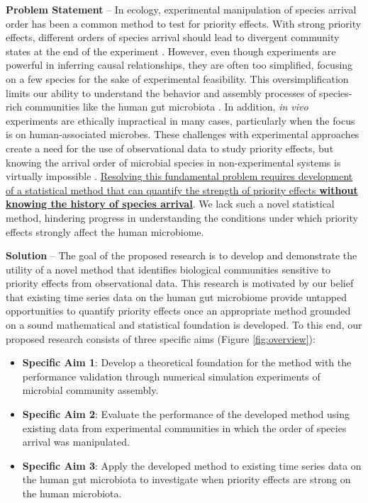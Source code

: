 \documentclass[12pt, class=article, crop=false]{standalone}
\begin{document}
\textbf{Problem Statement} --
In ecology, experimental manipulation of species arrival order has been a common method to test for priority effects.
With strong priority effects, different orders of species arrival should lead to divergent community states at the end of the experiment \citep{fukami_historical_2015, sprockett_role_2018}.
However, even though experiments are powerful in inferring causal relationships, they are often too simplified, focusing on a few species for the sake of experimental feasibility.
This oversimplification limits our ability to understand the behavior and assembly processes of species-rich communities like the human gut microbiota \citep{fierer_animalcules_2012}. 
In addition, \textit{in vivo} experiments are ethically impractical in many cases, particularly when the focus is on human-associated microbes. 
These challenges with experimental approaches create a need for the use of observational data to study priority effects, but knowing the arrival order of microbial species in non-experimental systems is virtually impossible  \citep{sprockett_role_2018}.
\ul{Resolving this fundamental problem requires development of a statistical method that can quantify the strength of priority effects \textbf{without knowing the history of species arrival}}.
We lack such a novel statistical method, hindering progress in understanding the conditions under which priority effects strongly affect the human microbiome.

\textbf{Solution} --
The goal of the proposed research is to develop and demonstrate the utility of a novel method that identifies biological communities sensitive to priority effects from observational data.
This research is motivated by our belief that existing time series data on the human gut microbiome provide untapped opportunities to quantify priority effects once an appropriate method grounded on a sound mathematical and statistical foundation is developed.
To this end, our proposed research consists of three specific aims (Figure \ref{fig:overview}):

\begin{itemize}
    \item \textbf{Specific Aim 1}:  Develop a theoretical foundation for the method with the performance validation through numerical simulation experiments of microbial community assembly.
    \item \textbf{Specific Aim 2}: Evaluate the performance of the developed method using existing data from experimental communities in which the order of species arrival was manipulated.
    \item \textbf{Specific Aim 3}: Apply the developed method to existing time series data on the human gut microbiota to investigate when priority effects are strong on the human microbiota.
\end{itemize}
\end{document}
